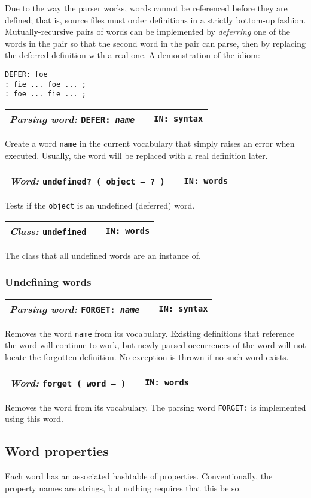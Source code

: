 \documentclass{report}
\newcommand{\parsingword}[3]{\index{#1}
\emph{Parsing word:} \texttt{#2} &&\texttt{IN: #3}}
\newcommand{\ordinaryword}[3]{\index{#1}
\emph{Word:} \texttt{#2} &&\texttt{IN: #3}}
\newcommand{\classword}[2]{\index{#1}
\emph{Class:} \texttt{#1} &&\texttt{IN: #2}}
\newcommand{\wordtable}[1]{

\begin{tabularx}{12cm}[t]{lXr}
\hline
#1\\
\hline
\end{tabularx}

}
\begin{document}
Due to the way the parser works, words cannot be referenced before they are defined; that is, source files must order definitions in a strictly bottom-up fashion. Mutually-recursive pairs of words can be implemented by \emph{deferring} one of the words in the pair so that the second word in the pair can parse, then by replacing the deferred definition with a real one.
A demonstration of the idiom:
\begin{verbatim}
DEFER: foe
: fie ... foe ... ;
: foe ... fie ... ;
\end{verbatim}
\wordtable{
\parsingword{DEFER:}{DEFER:~\emph{name}}{syntax}
}
Create a word \texttt{name} in the current vocabulary that simply raises an error when executed. Usually, the word will be replaced with a real definition later.
\wordtable{
\ordinaryword{undefined?}{undefined?~( object -- ?~)}{words}
}
Tests if the \texttt{object} is an undefined (deferred) word.
\wordtable{
\classword{undefined}{words}
}
The class that all undefined words are an instance of.

\subsubsection{Undefining words}

\wordtable{
\parsingword{FORGET:}{FORGET:~\emph{name}}{syntax}
}
Removes the word \texttt{name} from its vocabulary. Existing definitions that reference the word will continue to work, but newly-parsed occurrences of the word will not locate the forgotten definition. No exception is thrown if no such word exists.
\wordtable{
\ordinaryword{forget}{forget ( word -- )}{words}
}
Removes the word from its vocabulary. The parsing word \texttt{FORGET:} is implemented using this word.

\subsection{\label{word-props}Word properties}


Each word has an associated hashtable of properties. Conventionally, the property names are strings, but nothing requires that this be so.
\end{document}
